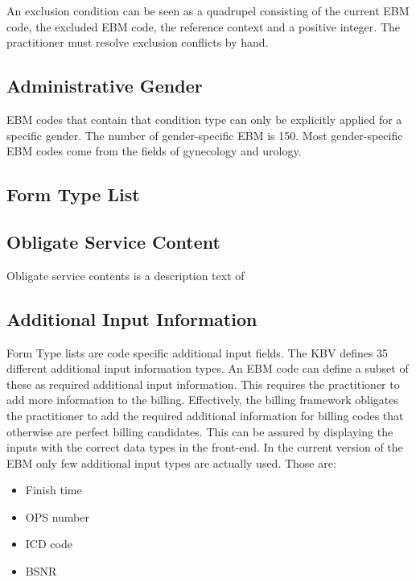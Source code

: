 An exclusion condition can be seen as a quadrupel consisting of the current EBM code, the excluded EBM code, the reference context and a positive integer.
The practitioner must resolve exclusion conflicts by hand.

\subsection{Administrative Gender}\label{subsec:administrative-gender}
EBM codes that contain that condition type can only be explicitly applied for a specific gender.
The number of gender-specific EBM is 150.
Most gender-specific EBM codes come from the fields of gynecology and urology.

\subsection{Form Type List}\label{subsec:form-type-list}

\subsection{Obligate Service Content}\label{subsec:obligate-service-content}
Obligate service contents is a description text of \todo{}

\subsection{Additional Input Information}\label{subsec:additional-information}
Form Type lists are code specific additional input fields.
The KBV defines 35 different additional input information types.
An EBM code can define a subset of these as required additional input information.
This requires the practitioner to add more information to the billing.
Effectively, the billing framework obligates the practitioner to add the required additional information for billing codes that otherwise are perfect billing candidates.
This can be assured by displaying the inputs with the correct data types in the front-end.
In the current version of the EBM only few additional input types are actually used.
Those are:
\begin{itemize}
    \item Finish time
    \item OPS number
    \item ICD code
    \item BSNR
\end{itemize}